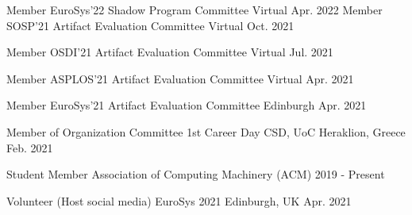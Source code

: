 
\begin{cvhonors}
  \cvhonor
    {Member} %
    {EuroSys'22 Shadow Program Committee} %
    {Virtual} %
    {Apr. 2022} %
  \cvhonor
    {Member} %
    {SOSP'21 Artifact Evaluation Committee} %
    {Virtual} %
    {Oct. 2021} %

  \cvhonor
    {Member} %
    {OSDI'21 Artifact Evaluation Committee} %
    {Virtual} %
    {Jul. 2021} %

  \cvhonor
    {Member} %
    {ASPLOS'21 Artifact Evaluation Committee} %
    {Virtual} %
    {Apr. 2021} %


  \cvhonor
    {Member} %
    {EuroSys'21 Artifact Evaluation Committee} %
    {Edinburgh} %
    {Apr. 2021} %
	
  \cvhonor
    {Member of Organization Committee} %
    {1st Career Day CSD, UoC} %
    {Heraklion, Greece} %
    {Feb. 2021} %

  \cvhonor
    {Student Member} %
    {Association of Computing Machinery (ACM)} %
    {} %
    {2019 - Present} %

  \cvhonor
    {Volunteer (Host social media)} %
    {EuroSys 2021} %
    {Edinburgh, UK} %
    {Apr. 2021} %


\end{cvhonors}
